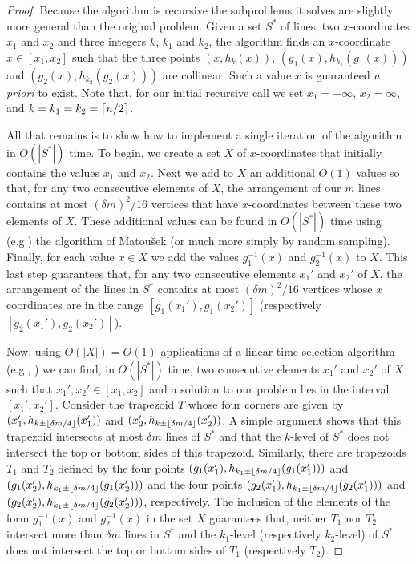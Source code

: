 \documentclass[lotsofwhite]{patmorin}
\begin{document}
\begin{proof}
Because the algorithm is recursive the subproblems it solves are
slightly more general than the original problem.  Given a set $S^*$ of
lines, two $x$-coordinates $x_1$ and $x_2$ and three integers $k$,
$k_1$ and $k_2$, the algorithm finds an $x$-coordinate $x\in[x_1,x_2]$
such that the three points $(x,h_k(x))$, $(g_1(x),h_{k_1}(g_1(x)))$
and $(g_2(x),h_{k_2}(g_2(x)))$ are collinear.  Such a value $x$ is
guaranteed \emph{a priori} to exist.  Note that, for our initial
recursive call we set $x_1=-\infty$, $x_2=\infty$, and
$k=k_1=k_2=\left\lceil n/2 \right\rceil$.

All that remains is to show how to implement a single iteration of the
algorithm in $O(|S^*|)$ time.  To begin, we create a set $X$ of
$x$-coordinates that initially contains the values $x_1$ and $x_2$.
Next we add to $X$ an additional $O(1)$ values so that, for any two
consecutive elements of $X$, the arrangement of our $m$ lines contains
at most $(\delta m)^2/16$ vertices that have $x$-coordinates between
these two elements of $X$.  These additional values can be found in
$O(|S^*|)$ time using (e.g.) the algorithm of Matou\v{s}ek \cite{m91}
(or much more simply by random sampling).  Finally, for each value
$x\in X$ we add the values $g_1^{-1}(x)$ and $g_2^{-1}(x)$ to $X$.
This last step guarantees that, for any two consecutive elements
$x_1'$ and $x_2'$ of $X$, the arrangement of the lines in $S^*$
contains at most $(\delta m)^2/16$ vertices whose $x$ coordinates are
in the range $[g_1(x_1'),g_1(x_2')]$ (respectively
$[g_2(x_1'),g_2(x_2')]$). 

Now, using $O(|X|)=O(1)$ applications of a linear time selection
algorithm (e.g., \cite{bea73}) we can 
find, in $O(|S^*|)$ time, two consecutive elements $x_1'$
and $x_2'$ of $X$ such that $x_1',x_2'\in[x_1,x_2]$ and a solution to our
problem lies in the interval $[x_1',x_2']$.  Consider the trapezoid
$T$ whose four corners are given by $(x_1',h_{k\pm\left\lfloor \delta
m/4 \right\rfloor}(x_1'))$ and $(x_2',h_{k\pm\left\lfloor \delta m/4 \right\rfloor}(x_2'))$.  A simple
argument \cite[Lemma~X]{lms94} shows that this trapezoid intersects at
most $\delta m$ lines of $S^*$ and that the $k$-level of $S^*$ does
not intersect the top or bottom sides of this trapezoid.  Similarly,
there are trapezoids $T_1$ and $T_2$ defined by the four points 
$(g_1(x_1'),h_{k_1\pm\left\lfloor \delta m/4 \right\rfloor}(g_1(x_1')))$ and
$(g_1(x_2'),h_{k_1\pm\left\lfloor \delta m/4 \right\rfloor}(g_1(x_2')))$ and the four
points
$(g_2(x_1'),h_{k_1\pm\left\lfloor \delta m/4 \right\rfloor}(g_2(x_1')))$ and
$(g_2(x_2'),h_{k_1\pm\left\lfloor \delta m/4 \right\rfloor}(g_2(x_2')))$, respectively.
The inclusion of the elements of the form $g_1^{-1}(x)$ and
$g_2^{-1}(x)$ in the set $X$ guarantees that, neither $T_1$ 
nor $T_2$ intersect more than $\delta m$ lines in $S^*$
and the $k_1$-level (respectively $k_2$-level) of $S^*$ does not
intersect the top or bottom sides of $T_1$ (respectively $T_2$).


\end{proof}
\end{document}
